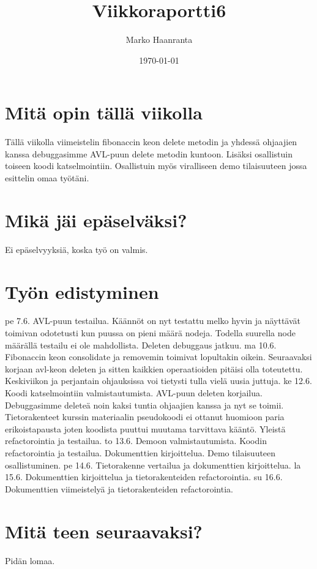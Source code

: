 \documentclass[11pt,a4paper]{article}
\author{Marko Haanranta}
\date{\today}
\title{Viikkoraportti6}
\begin{document}
\maketitle
\section{Mitä opin tällä viikolla}
Tällä viikolla viimeistelin fibonaccin keon delete metodin ja yhdessä ohjaajien kanssa debuggasimme AVL-puun delete metodin kuntoon. Lisäksi osallistuin toiseen koodi katselmointiin. Osallistuin myös viralliseen demo tilaisuuteen jossa esittelin omaa työtäni. 
\section{Mikä jäi epäselväksi?}
Ei epäselvyyksiä, koska työ on valmis.
\section{Työn edistyminen}
pe 7.6.
AVL-puun testailua. Käännöt on nyt testattu melko hyvin ja näyttävät toimivan odotetusti kun puussa
on pieni määrä nodeja. Todella suurella node määrällä testailu ei ole mahdollista.
Deleten debuggaus jatkuu.
ma 10.6.
Fibonaccin keon consolidate ja removemin toimivat lopultakin oikein. Seuraavaksi korjaan avl-keon deleten ja
sitten kaikkien operaatioiden pitäisi olla toteutettu. Keskiviikon ja perjantain ohjauksissa voi tietysti tulla vielä
uusia juttuja.
ke 12.6.
Koodi katselmointiin valmistautumista. AVL-puun deleten korjailua. Debuggasimme deleteä noin kaksi tuntia
ohjaajien kanssa ja nyt se toimii. Tietorakenteet kurssin materiaalin pseudokoodi ei ottanut huomioon paria
erikoistapausta joten koodista puuttui muutama tarvittava kääntö. Yleistä refactorointia ja testailua.
to 13.6.
Demoon valmistautumista. Koodin refactorointia ja testailua. Dokumenttien kirjoittelua.
Demo tilaisuuteen osallistuminen.
pe 14.6.
Tietorakenne vertailua ja dokumenttien kirjoittelua.
la 15.6.
Dokumenttien kirjoittelua ja tietorakenteiden refactorointia.
su 16.6.
Dokumenttien viimeistelyä ja tietorakenteiden refactorointia.
\section{Mitä teen seuraavaksi?}
Pidän lomaa.
\end{document}
